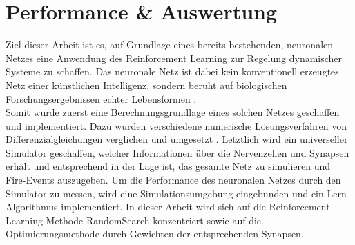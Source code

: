 %
\chapter{Performance \& Auswertung}
\label{chap:erg}
%
	Ziel dieser Arbeit ist es, auf Grundlage eines bereits bestehenden, neuronalen Netzes eine Anwendung des Reinforcement Learning zur Regelung dynamischer Systeme zu schaffen. Das neuronale Netz ist dabei kein konventionell erzeugtes Netz einer künstlichen Intelligenz, sondern beruht auf biologischen Forschungsergebnissen echter Lebensformen \cite{CElegans} \cite{SimCE}.\\
	Somit wurde zuerst eine Berechnungsgrundlage eines solchen Netzes geschaffen und implementiert. Dazu wurden verschiedene numerische Lösungsverfahren von Differenzialgleichungen verglichen und umgesetzt \cite{NonlinearDynamics}. Letztlich wird ein universeller Simulator geschaffen, welcher Informationen über die Nervenzellen und Synapsen erhält und entsprechend in der Lage ist, das gesamte Netz zu simulieren und Fire-Events auszugeben. Um die Performance des neuronalen Netzes durch den Simulator zu messen, wird eine Simulationsumgebung eingebunden und ein Lern-Algorithmus implementiert. In dieser Arbeit wird sich auf die Reinforcement Learning Methode RandomSearch konzentriert sowie auf die Optimierungsmethode durch Gewichten der entsprechenden Synapsen.

